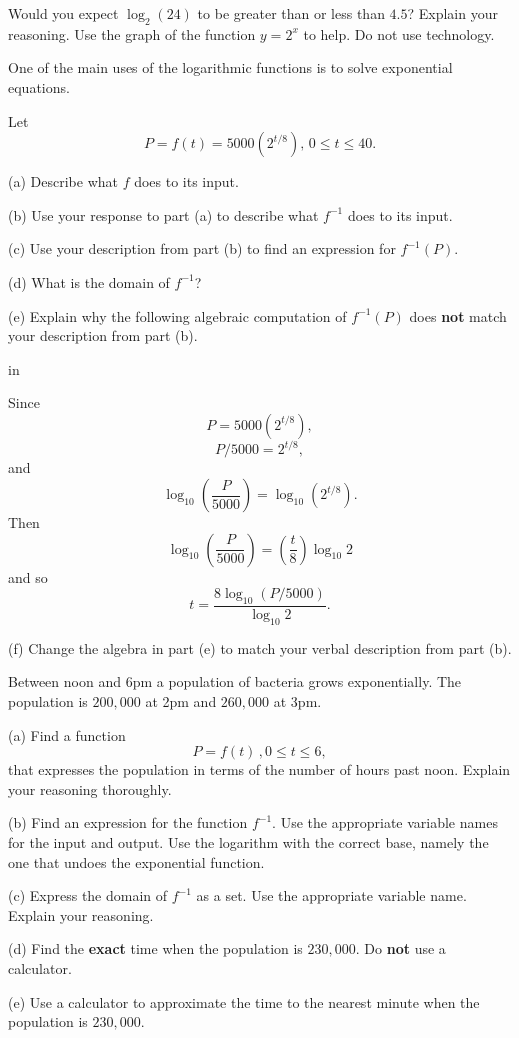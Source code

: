 \documentclass{ximera}
\newcommand{\pskip}{\vskip 0.1 in}
\begin{document}
\begin{question} \label{Q4:LogF}
Would you expect $\log_2(24)$ to be greater than or less than $4.5$? Explain your reasoning. Use the graph of the function $y=2^x$ to help. Do not use technology.
\end{question}



One of the main uses of the logarithmic functions is to solve exponential equations.

\begin{question} \label{Q5:LogF}
Let
\[
   P =  f(t) = 5000 (2^{t/8}) , \, 0\leq t \leq 40.
\]

(a) Describe what $f$ does to its input.

(b) Use your response to part (a) to describe what $f^{-1}$ does to its input.

(c) Use your description from part (b) to find an expression for $f^{-1}(P)$. 

(d) What is the domain of $f^{-1}$?

(e) Explain why the following algebraic computation of $f^{-1}(P)$ does {\bf not} match your description from part (b).

\pskip

Since
\[
   P = 5000 (2^{t/8}) ,
\]
\[
   P/5000 = 2^{t/8} ,
\]
and 
\[
   \log_{10}\left( \frac{P}{5000} \right) = \log_{10} (2^{t/8}) .
\]
Then
\[
   \log_{10}\left( \frac{P}{5000} \right) =  \left( \frac{t}{8}  \right)  \log_{10} 2 
\]
and so 
\[
    t = \frac{8 \log_{10}(P/5000)}{\log_{10} 2} .
\]

(f) Change the algebra in part (e) to match your verbal description from part (b).
\end{question}


\begin{question} \label{Q7:LogF}
Between noon and 6pm a population of bacteria grows exponentially. The population is $200,000$ at 2pm and $260,000$ at 3pm.

(a) Find a function 
\[
     P = f(t) \, , 0\leq t \leq 6 ,
\]
that expresses the population in terms of the number of hours past noon. Explain your reasoning thoroughly.

(b) Find an expression for the function $f^{-1}$. Use the appropriate variable names for the input and output. Use the logarithm with the correct base, namely the one that undoes the exponential function.

(c) Express the domain of $f^{-1}$ as a set. Use the appropriate variable name. Explain your reasoning.

(d) Find the {\bf exact} time when the population is $230,000$. Do {\bf not} use a calculator.

(e) Use a calculator to approximate the time to the nearest minute when the population is $230,000$.




\end{question}
\end{document}
